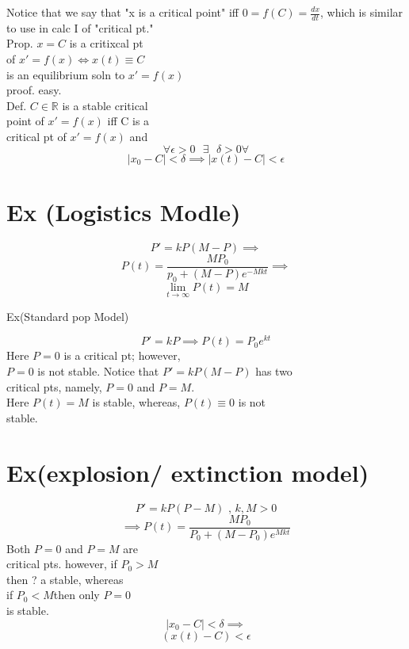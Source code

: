\documentclass[10pt,a4paper]{article}
\theoremstyle{definition}
\begin{document}
  Notice that we say that "x is a critical point" iff \( 0 = f(C) =
  \frac{dx}{dt} \), which is similar to use in calc I of  "critical pt." \\[5mm]

  Prop. \( x=C \) is a critixcal pt \\
  of \( x'=f(x) \iff x(t) \equiv  C \) \\
  is an equilibrium soln to \( x' = f(x) \) \\
  proof. easy. \\[5mm] 
  Def. \( C \in \mathbb{R} \) is a stable critical \\
  point of \( x' = f(x) \) iff C is a \\
  critical pt of \( x' = f(x)  \) and \\
  \[ \forall \epsilon >0 \text{  } \exists \text{  } \delta >0 \forall \]
  \[ |x_0 -C| < \delta  \implies |x(t) -C| < \epsilon  \]

\section*{Ex (Logistics Modle)}
  \[ P' = kP(M-P) \implies \]
  \[ P(t) = \frac{MP_0}{p_0 + (M - P) e^{-Mkt} } \implies  \]
  \[ \lim_{t \to \infty}P(t) = M \]

  Ex(Standard pop Model) 

  \[ P' = kP \implies P(t) = P_0 e^{kt}  \]
  Here \( P=0 \) is a critical pt; however, \\
  \( P=0  \) is not stable. 
  Notice that \( P' = kP(M-P)  \) has two \\
  critical pts, namely, \( P = 0 \) and \( P =M \). \\
  Here \( P(t) = M \) is stable, whereas, \( P(t) \equiv 0 \) is not \\
  stable.  \\[5mm]  
\section*{Ex(explosion/ extinction model)}
  \[ P' = kP(P-M) \text{ , } k, M>0\]
  \[ \implies P(t) = \frac{MP_0}{P_0 + (M-P_0)e^{Mkt}} \]
  Both \( P=0 \) and \( P=M  \) are \\
  critical pts. however, if \( P_0 > M \) \\
  then ? a stable, whereas \\
  if \( P_0 <M  \)then only \( P=0 \) \\
  is stable.
  \[ |x_0 - C| < \delta  \implies  \]
  \[ (x(t) -C) < \epsilon  \]
\end{document}
